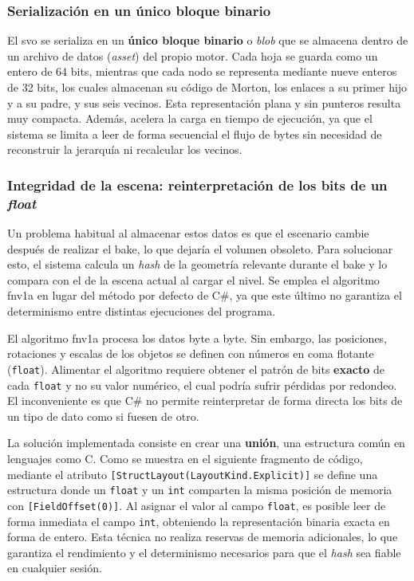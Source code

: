 \subsubsection{Serialización en un único bloque binario}
\label{sec:iter-persistencia}

El \acrshort{svo} se serializa en un \textbf{único bloque binario} o \textit{blob} que se almacena dentro de un archivo de datos (\textit{asset}) del propio motor.
Cada hoja se guarda como un entero de 64 bits, mientras que cada nodo se representa mediante nueve enteros de 32 bits, los cuales almacenan su código de Morton, los enlaces a su primer hijo y a su padre, y sus seis vecinos.
Esta representación plana y sin punteros resulta muy compacta.
Además, acelera la carga en tiempo de ejecución, ya que el sistema se limita a leer de forma secuencial el flujo de bytes sin necesidad de reconstruir la jerarquía ni recalcular los vecinos.

\subsubsection{Integridad de la escena: reinterpretación de los bits de un \textit{float}}
\label{sec:hash-float}

Un problema habitual al almacenar estos datos es que el escenario cambie después de realizar el \gls{bake}, lo que dejaría el volumen obsoleto.
Para solucionar esto, el sistema calcula un \textit{hash} de la geometría relevante durante el \gls{bake} y lo compara con el de la escena actual al cargar el nivel.
Se emplea el algoritmo \gls{fnv1a} en lugar del método por defecto de C\#, ya que este último no garantiza el determinismo entre distintas ejecuciones del programa.

El algoritmo \gls{fnv1a} procesa los datos byte a byte.
Sin embargo, las posiciones, rotaciones y escalas de los objetos se definen con números en coma flotante (\texttt{float}).
Alimentar el algoritmo requiere obtener el patrón de bits \textbf{exacto} de cada \texttt{float} y no su valor numérico, el cual podría sufrir pérdidas por redondeo.
El inconveniente es que C\# no permite reinterpretar de forma directa los bits de un tipo de dato como si fuesen de otro.

La solución implementada consiste en crear una \textbf{unión}, una estructura común en lenguajes como C.
Como se muestra en el siguiente fragmento de código, mediante el atributo \texttt{[StructLayout(LayoutKind.Explicit)]} se define una estructura donde un \texttt{float} y un \texttt{int} comparten la misma posición de memoria con \texttt{[FieldOffset(0)]}.
Al asignar el valor al campo \texttt{float}, es posible leer de forma inmediata el campo \texttt{int}, obteniendo la representación binaria exacta en forma de entero.
Esta técnica no realiza reservas de memoria adicionales, lo que garantiza el rendimiento y el determinismo necesarios para que el \textit{hash} sea fiable en cualquier sesión.

